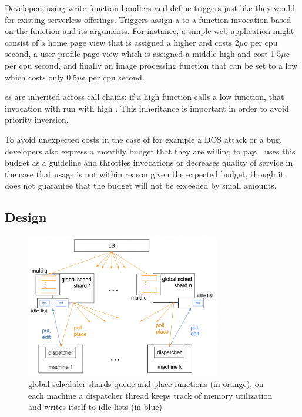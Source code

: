 Developers using \sys{} write function handlers and define triggers just like
they would for existing serverless offerings.  Triggers assign a \priceclass{}
to a function invocation based on the function and its arguments.
For instance, a simple web application might consist of a home page view that is
assigned a higher \priceclass{} and costs 2$\mu\cent$ per cpu second, a user
profile page view which is assigned a middle-high \class{} and cost
1.5$\mu\cent$ per cpu second, and finally an image processing function that can
be set to a low \class{} which costs only 0.5$\mu\cent$ per cpu second.

\Class{}es are inherited across call chains: if a high \class{} function calls a
low \class{} function, that invocation with run with high \class{}. This
inheritance is important in order to avoid priority inversion.

To avoid unexpected costs in the case of for example a DOS attack or a bug,
developers also express a monthly budget that they are willing to pay.~\Sys{}
uses this budget as a guideline and throttles invocations or decreases quality
of service in the case that usage is not within reason given the expected
budget, though it does not guarantee that the budget will not be exceeded by
small amounts.

\subsection{\Sys{} Design}

\begin{figure}[t]
    \centering
      \includegraphics[width=8.5cm]{img/overview.png}
      \caption{ global scheduler shards queue and place functions (in orange),
      on each machine a dispatcher thread keeps track of memory utilization and
      writes itself to idle lists (in blue) }
    \label{fig:overview}
\end{figure}



